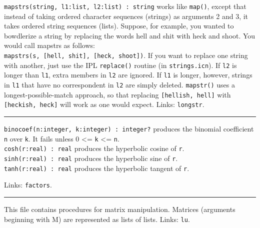 \texttt{mapstrs(string, l1:list, l2:list) : string} works like
\texttt{map()}, except that instead of taking ordered character
sequences (strings) as arguments 2 and 3, it takes ordered string
sequences (lists). Suppose, for example, you wanted to
bowdlerize a string by replacing the words
{\textquotedbl}hell{\textquotedbl} and
{\textquotedbl}shit{\textquotedbl} with
{\textquotedbl}heck{\textquotedbl} and
{\textquotedbl}shoot.{\textquotedbl} You would call mapstrs as
follows:\\
\texttt{mapstrs(s, [{\textquotedbl}hell{\textquotedbl},
{\textquotedbl}shit{\textquotedbl}],
[{\textquotedbl}heck{\textquotedbl},
{\textquotedbl}shoot{\textquotedbl}])}. If you want to replace one
string with another, just use the IPL \texttt{replace()} routine (in
\texttt{strings.icn}). If \texttt{l2} is longer than \texttt{l1}, extra
members in \texttt{l2} are ignored. If \texttt{l1} is longer, however,
strings in \texttt{l1} that have no correspondent in \texttt{l2} are
simply deleted. \texttt{mapstr()} uses a longest-possible-match
approach, so that replacing
\texttt{[{\textquotedbl}hellish{\textquotedbl},
{\textquotedbl}hell{\textquotedbl}]} with
\texttt{[{\textquotedbl}heckish{\textquotedbl},
{\textquotedbl}heck{\textquotedbl}]} will work as one would expect.
Links: \texttt{longstr}.

\vspace{0.25cm}\hrule{}

\texttt{binocoef(n:integer, k:integer) : integer?} produces the
binomial coefficient \texttt{n} over
\texttt{k}. It fails unless 0 {\textless}= \texttt{k} {\textless}=
\texttt{n}.\\
\texttt{cosh(r:real) : real} produces the hyperbolic cosine of \texttt{r}.\\
\texttt{sinh(r:real) : real} produces the hyperbolic sine of
\texttt{r}.\\
\texttt{tanh(r:real) : real} produces the hyperbolic tangent of
\texttt{r}.

Links: \texttt{factors}.

\vspace{0.25cm}\hrule{}

This file contains procedures for matrix
manipulation. Matrices (arguments beginning with M) are represented as
lists of lists. Links: \texttt{lu}.


